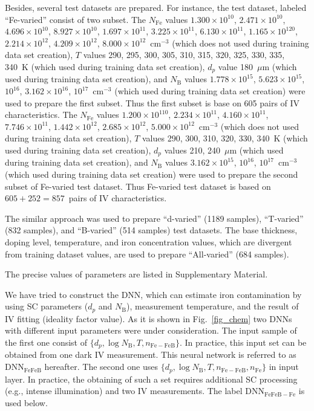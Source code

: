 \documentclass[num-refs]{wiley-article} %
\begin{document}
Besides, several test datasets are prepared.
For instance, the test dataset, labeled ``Fe-varied'' consist of two subset.
The $N_{\mathrm{Fe}}$ values
$1.300\times10^{10}$, $2.471\times10^{10}$, $4.696\times10^{10}$,
$8.927\times10^{10}$, $1.697\times10^{11}$, $3.225\times10^{11}$,
$6.130\times10^{11}$, $1.165\times10^{120}$, $2.214\times10^{12}$,
$4.209\times10^{12}$, $8.000\times10^{12}$~cm$^{-3}$
(which does not used during training data set creation),
$T$ values 290, 295, 300, 305, 310, 315, 320, 325, 330, 335, 340~K
(which used during training data set creation),
$d_p$ value 180~$\mu$m (which used during training data set creation),
and $N_\mathrm{B}$ values
$1.778\times10^{15}$, $5.623\times10^{15}$, $10^{16}$,
$3.162\times10^{16}$, $10^{17}$~cm$^{-3}$
(which used during training data set creation)
were used to prepare the first subset.
Thus the first subset is base on 605 pairs of IV characteristics.
The $N_{\mathrm{Fe}}$ values
$1.200\times10^{110}$, $2.234\times10^{11}$, $4.160\times10^{11}$,
$7.746\times10^{11}$, $1.442\times10^{12}$, $2.685\times10^{12}$,
$5.000\times10^{12}$~cm$^{-3}$
(which does not used during training data set creation),
$T$ values 290, 300, 310, 320, 330, 340~K
(which used during training data set creation),
$d_p$ values 210, 240~$\mu$m (which used during training data set creation),
and $N_\mathrm{B}$ values
$3.162\times10^{15}$, $10^{16}$,
$10^{17}$~cm$^{-3}$
(which used during training data set creation)
were used to prepare the second subset of Fe-varied test dataset.
Thus Fe-varied test dataset is based on $605+252=857$~pairs of IV characteristics.

The similar approach was used to prepare ``d-varied'' (1189 samples), ``T-varied'' (832 samples), and ``B-varied'' (514 samples) test datasets.
The base thickness, doping level, temperature, and iron concentration values, which are divergent from training dataset values, are used to prepare ``All-varied'' (684 samples).

The precise values of parameters are listed in Supplementary Material.

We have tried to construct the DNN, which can estimate iron contamination by using
SC parameters ($d_p$ and $N_\mathrm{B}$),  measurement temperature, and the result of IV fitting (ideality factor value).
As it is shown in Fig.~\ref{fig_chem} two DNNs with different input parameters were under consideration.
The input sample of the first one consist of $\{d_p,\log N_\mathrm{B},T,n_\mathrm{Fe-FeB}\}$.
In practice, this input set can be obtained from one dark IV measurement.
This neural network is referred to as DNN$_\mathrm{FeFeB}$ hereafter.
The second one uses  $\{d_p,\log N_\mathrm{B},T,n_\mathrm{Fe-FeB},n_\mathrm{Fe}\}$ in input layer.
In practice, the obtaining of such a set requires additional SC processing (e.g., intense illumination) and two IV measurements.
The label  DNN$_\mathrm{FeFeB-Fe}$ is used below.
\end{document}
